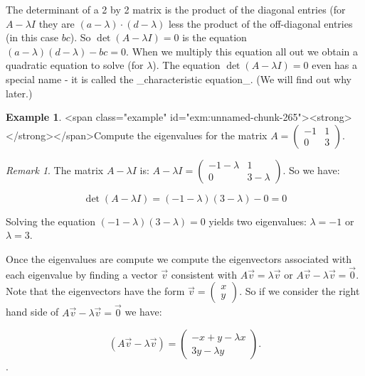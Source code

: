 \documentclass[
]{book}
\theoremstyle{definition}
\theoremstyle{definition}
\newtheorem{example}{Example}[chapter]
\theoremstyle{definition}
\theoremstyle{remark}
\newtheorem*{remark}{Remark}
\begin{document}
The determinant of a 2 by 2 matrix is the product of the diagonal entries (for $A - \lambda I$ they are $(a-\lambda)\cdot (d-\lambda)$ less the product of the off-diagonal entries (in this case $bc$).  So $\det(A-\lambda I)=0$ is the equation $(a-\lambda)(d-\lambda)-bc=0$. When we multiply this equation all out we obtain a quadratic equation to solve (for $\lambda$).  The equation $\det(A - \lambda I)=0$ even has a special name - it is called the _characteristic equation_. (We will find out why later.)

\begin{example}
<span class="example" id="exm:unnamed-chunk-265"><strong>\label{exm:unnamed-chunk-265} </strong></span>Compute the eigenvalues for the matrix $\displaystyle A =  \begin{pmatrix} -1 & 1 \\ 0 &  3 \end{pmatrix}$.
\end{example}

\begin{remark}
{}The matrix $A-\lambda I$ is:
$\displaystyle A-\lambda I =  \begin{pmatrix} -1-\lambda & 1 \\ 0 &  3-\lambda \end{pmatrix}$.  So we have:

\begin{equation}
\det(A-\lambda I) =  (-1-\lambda)(3-\lambda) - 0 = 0
\end{equation}

Solving the equation $(-1-\lambda)(3-\lambda)=0$ yields two eigenvalues: $\lambda = -1$ or $\lambda = 3$.
\end{remark}

Once the eigenvalues are compute we compute the eigenvectors associated with each eigenvalue by finding a vector $\vec{v}$ consistent with $A \vec{v} = \lambda \vec{v}$ or $A \vec{v} - \lambda \vec{v} =\vec{0}$.  Note that the eigenvectors have the form $\displaystyle \vec{v} = \begin{pmatrix} x \\ y \end{pmatrix}$.  So if we consider the right hand side of $A \vec{v} - \lambda \vec{v} =\vec{0}$ we have:

\begin{equation*}
( A \vec{v} - \lambda \vec{v} ) =  \begin{pmatrix} -x +y - \lambda x  \\ 3y - \lambda y \end{pmatrix}.
\end{equation*}.
\end{document}
